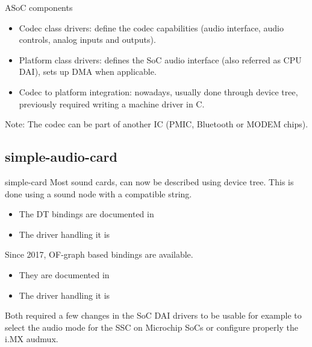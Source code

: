 \begin{frame}{ASoC components}
  \begin{itemize}
  \item Codec class drivers: define the codec capabilities (audio
    interface, audio controls, analog inputs and outputs).
  \item Platform class drivers: defines the SoC audio interface (also
    referred as CPU DAI), sets up DMA when applicable.
  \item Codec to platform integration: nowadays, usually done through
    device tree, previously required writing a machine driver in C.
  \end{itemize}
  Note: The codec can be part of another IC (PMIC, Bluetooth or MODEM
  chips).
\end{frame}

\subsection{simple-audio-card}

\begin{frame}[fragile]{simple-card}
  Most sound cards, can now be described using device tree. This is
  done using a sound node with a  compatible
  string.
  \begin{itemize}
  \item The DT bindings are documented in
  \item The driver handling it is 
  \end{itemize}
  Since 2017, OF-graph based bindings are available.
  \begin{itemize}
  \item They are documented in
  \item The driver handling it is 
  \end{itemize}
  Both required a few changes in the SoC DAI drivers to be usable for
  example to select the audio mode for the SSC on Microchip SoCs or
  configure properly the i.MX audmux.
\end{frame}

